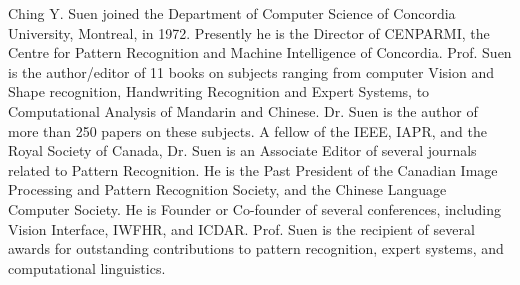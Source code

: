 \documentclass[ijdar]{svjour}
\begin{document}
\vspace*{-9mm}

\begin{biography}
{Ching Y. Suen}
joined the Department of Computer Science of Concordia University, Montreal, in 1972. Presently he is the Director of CENPARMI, the Centre for Pattern Recognition and Machine Intelligence of Concordia.
Prof. Suen is the author/editor of 11 books on subjects ranging from computer Vision and Shape recognition, Handwriting Recognition and Expert Systems, to Computational Analysis of Mandarin and Chinese.
Dr. Suen is the author of more than 250 papers on these subjects.
A fellow of the IEEE, IAPR, and the Royal Society of Canada, Dr. Suen is an Associate Editor of several journals related to Pattern Recognition.
He is the Past President of the Canadian Image Processing and Pattern Recognition Society, and the Chinese Language Computer Society.  He is Founder or Co-founder of several conferences, including Vision Interface, IWFHR, and ICDAR.
Prof. Suen is the recipient of several awards for outstanding contributions to pattern recognition, expert systems, and computational linguistics.
\end{biography}
\end{document}
